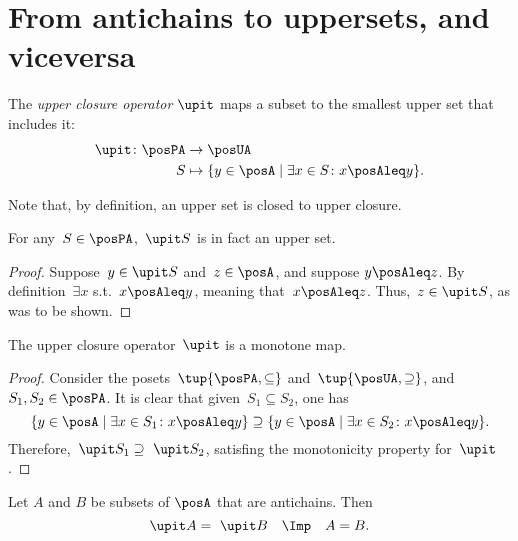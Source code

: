
\section{From antichains to uppersets, and viceversa}
\begin{definition}
  \label{def:upperclosure}
  The \emph{upper closure operator} $\upit $ maps a subset to the smallest upper set that includes it:
  \begin{equation}
    \begin{aligned}
      \upit  \colon \posPA&\to \posUA \\
      S&\mapsto \{y\in \posA \mid \exists x\in S \colon x\posAleq y\}.
    \end{aligned}
  \end{equation}
\end{definition}
\begin{remark}
  Note that, by definition, an upper set is closed to upper closure.
\end{remark}
\begin{lemma}
  For any~$S\in \posPA$,~$\upit  S$ is in fact an upper set.
\end{lemma}
\begin{proof}
  Suppose~$y\in \upit  S$ and~$z\in \posA$, and suppose $y\posAleq z$. By definition~$\exists x$ s.t.~$x\posAleq y$, meaning that~$x\posAleq z$. Thus,~$z\in \upit  S$, as was to be shown.
\end{proof}


\begin{lemma}
  The upper closure operator~$\upit $ is a monotone map.
\end{lemma}
\begin{proof}
  Consider the posets~$\tup{\posPA,\subseteq}$ and~$\tup{\posUA ,\supseteq}$, and~$S_1,S_2\in \posPA$. It is clear that given~$S_1\subseteq S_2$, one has
  \begin{equation*}
    \{y\in \posA\mid \exists x\in S_1\colon x\posAleq y\} \supseteq \{y\in \posA\mid \exists x\in S_2\colon x\posAleq y\}.
  \end{equation*}
  Therefore,~$\upit  S_1\supseteq \ \upit  S_2$, satisfing the monotonicity property for~$\upit $.
\end{proof}

\begin{lemma}
  \label{lem:up-cl-inj-antichains}
  Let $A$ and $B$ be subsets of $\posA$ that are antichains. Then
  \begin{equation*}
    \upit  A = \ \upit  B \quad \Imp \quad A = B.
  \end{equation*}
\end{lemma}

